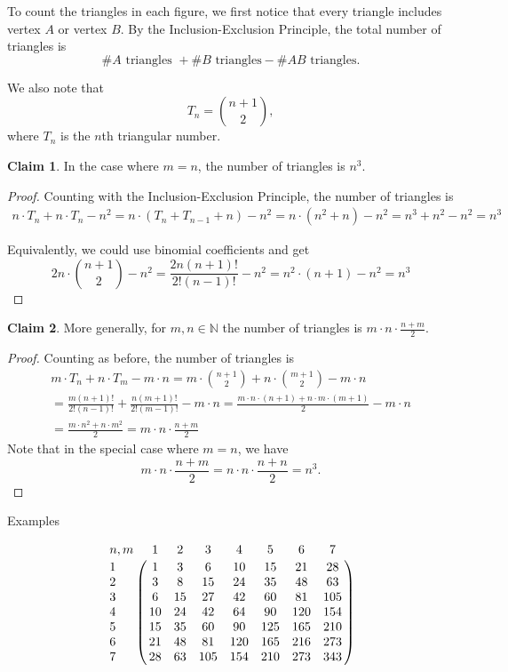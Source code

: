 \documentclass[12pt]{article}
\newcommand{\NN}{\mathbb{N}}
\theoremstyle{definition}
\newtheorem*{claim}{Claim}
\begin{document}
To count the triangles in each figure, we first notice that every triangle includes vertex $A$ or vertex $B$. By the Inclusion-Exclusion Principle, the total number of triangles is
$$\# A \text{ triangles } + \# B \text{ triangles} - \# AB \text{ triangles}.$$

We also note that
$$T_n = \binom{n + 1}{2},$$
where $T_n$ is the $n$th triangular number.

\begin{claim} In the case where $m = n$, the number of triangles is $n^3$.
	\begin{proof} Counting with the Inclusion-Exclusion Principle, the number of triangles is
	\begin{multline*} n \cdot T_n + n \cdot T_n - n^2 = n \cdot (T_n + T_{n-1} + n) - n^2 
	= n \cdot (n^2 + n) - n^2 = n^3 + n^2 - n^2 = n^3 \end{multline*}
	
	Equivalently, we could use binomial coefficients and get
	$$ 2n \cdot \binom{n + 1}{2} - n^2 = \frac{2 n (n + 1)!}{2! (n - 1)!} - n^2
	= n^2 \cdot (n + 1) - n^2 = n^3 $$
	\end{proof}
\end{claim}

\begin{claim} More generally, for $m, n \in \NN$ the number of triangles is $m \cdot n \cdot \frac{n + m}{2}$.
	\begin{proof} Counting as before, the number of triangles is
	\begin{multline*} m \cdot T_n + n \cdot T_m - m \cdot n = m \cdot \binom{n + 1}{2} + n \cdot \binom{m + 1}{2} - m \cdot n \\
	= \frac{m (n + 1)!}{2! (n - 1)!} + \frac{n (m + 1)!}{2! (m - 1)!} - m \cdot n = \frac{m \cdot n \cdot (n+1) + n \cdot m \cdot (m+1)}{2} - m \cdot n \\
	= \frac{m \cdot n^2 + n \cdot m^2}{2} = m \cdot n \cdot \frac{n+m}{2} \end{multline*}
	Note that in the special case where $m = n$, we have
	$$m \cdot n \cdot \frac{n+m}{2} = n \cdot n \cdot \frac{n+n}{2} = n^3.$$
	\end{proof}
\end{claim}

\large Examples \\
\normalsize

$$\bordermatrix{\text{$n, m$}	& 	1	&	2	&	3	&	4	&	5	&	6	&	7 \cr
                		1			&	1	&	3	&	6	&	10	&	15	&	21	&	28 \cr
                		2			& 	3	&	8	&	15	&	24	&	35	&	48	&	63 \cr
			3			&	6	&	15	&	27	&	42	&	60	&	81	&	105 \cr
			4			&	10	&	24	&	42	&	64	&	90	&	120	&	154 \cr
			5			&	15	&	35	&	60	&	90	&	125	&	165	&	210 \cr
			6			&	21	&	48	&	81	&	120	&	165	&	216	&	273 \cr
			7			&	28	&	63	&	105	&	154	&	210	&	273	&	343}$$
\end{document}
